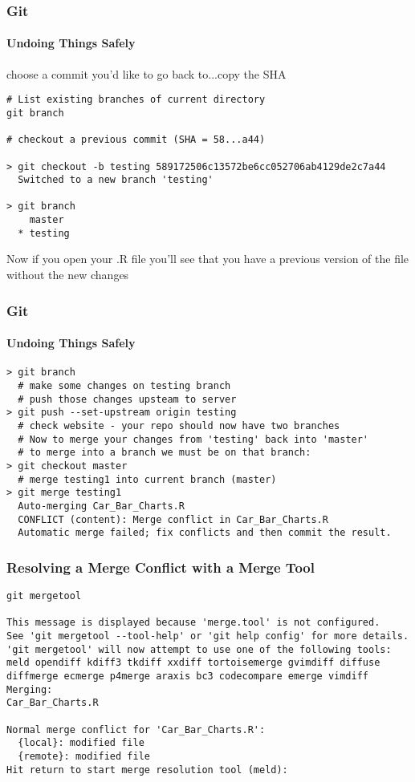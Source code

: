 \documentclass[xcolor=dvipsnames]{beamer}
\begin{document}
\begin{frame}[fragile]
\frametitle{Git}
\framesubtitle{Undoing Things Safely}
choose a commit you'd like to go back to...copy the SHA
\newline
\newline
\begin{lstlisting}
# List existing branches of current directory
git branch

# checkout a previous commit (SHA = 58...a44) 

> git checkout -b testing 589172506c13572be6cc052706ab4129de2c7a44
  Switched to a new branch 'testing'

> git branch
    master
  * testing
\end{lstlisting}

Now if you open your .R file you'll see that you have a previous version of the file without the new changes

\end{frame}

\begin{frame}[fragile]
\frametitle{Git}
\framesubtitle{Undoing Things Safely}

\begin{lstlisting}
> git branch
  # make some changes on testing branch
  # push those changes upsteam to server
> git push --set-upstream origin testing
  # check website - your repo should now have two branches
  # Now to merge your changes from 'testing' back into 'master'
  # to merge into a branch we must be on that branch:
> git checkout master
  # merge testing1 into current branch (master)
> git merge testing1
  Auto-merging Car_Bar_Charts.R
  CONFLICT (content): Merge conflict in Car_Bar_Charts.R
  Automatic merge failed; fix conflicts and then commit the result.
\end{lstlisting}

\end{frame}


\begin{frame}[fragile]
\frametitle{Resolving a Merge Conflict with a Merge Tool}
\begin{lstlisting}
git mergetool

This message is displayed because 'merge.tool' is not configured.
See 'git mergetool --tool-help' or 'git help config' for more details.
'git mergetool' will now attempt to use one of the following tools:
meld opendiff kdiff3 tkdiff xxdiff tortoisemerge gvimdiff diffuse diffmerge ecmerge p4merge araxis bc3 codecompare emerge vimdiff
Merging:
Car_Bar_Charts.R

Normal merge conflict for 'Car_Bar_Charts.R':
  {local}: modified file
  {remote}: modified file
Hit return to start merge resolution tool (meld): 
\end{lstlisting}
\end{frame}
\end{document}
